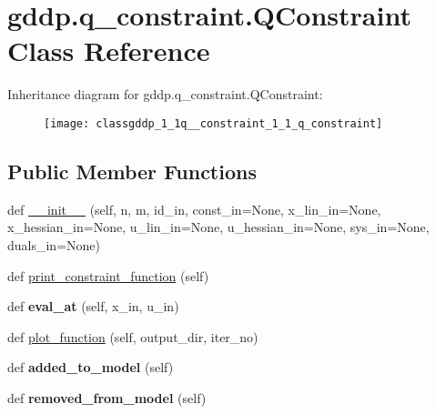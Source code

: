 \hypertarget{classgddp_1_1q__constraint_1_1_q_constraint}{}\section{gddp.\+q\+\_\+constraint.\+Q\+Constraint Class Reference}
\label{classgddp_1_1q__constraint_1_1_q_constraint}
Inheritance diagram for gddp.\+q\+\_\+constraint.\+Q\+Constraint\+:\begin{figure}[H]
\begin{center}
\leavevmode
\texttt{[image: classgddp\_1\_1q\_\_constraint\_1\_1\_q\_constraint]}
\end{center}
\end{figure}
\subsection*{Public Member Functions}
\begin{DoxyCompactItemize}
\item 
def \mbox{\hyperlink{classgddp_1_1q__constraint_1_1_q_constraint_a269770d220931d2942ee73e6591cee15}{\+\_\+\+\_\+init\+\_\+\+\_\+}} (self, n, m, id\+\_\+in, const\+\_\+in=None, x\+\_\+lin\+\_\+in=None, x\+\_\+hessian\+\_\+in=None, u\+\_\+lin\+\_\+in=None, u\+\_\+hessian\+\_\+in=None, sys\+\_\+in=None, duals\+\_\+in=None)
\item 
def \mbox{\hyperlink{classgddp_1_1q__constraint_1_1_q_constraint_a266f8b4749eb6c8476ce40112de8bda7}{print\+\_\+constraint\+\_\+function}} (self)
\item 
\mbox{\label{classgddp_1_1q__constraint_1_1_q_constraint_a51c775ceeb4c5b147c72146ad54905ff}} 
def {\bfseries eval\+\_\+at} (self, x\+\_\+in, u\+\_\+in)
\item 
def \mbox{\hyperlink{classgddp_1_1q__constraint_1_1_q_constraint_ad96e08f2921254849ee8763a1b84bad9}{plot\+\_\+function}} (self, output\+\_\+dir, iter\+\_\+no)
\item 
\mbox{\label{classgddp_1_1q__constraint_1_1_q_constraint_a703dfdf31a146952e8349a55ff92c015}} 
def {\bfseries added\+\_\+to\+\_\+model} (self)
\item 
\mbox{\label{classgddp_1_1q__constraint_1_1_q_constraint_a91d8182a1cb4e259701e71d9e68dc8e7}} 
def {\bfseries removed\+\_\+from\+\_\+model} (self)
\end{DoxyCompactItemize}
